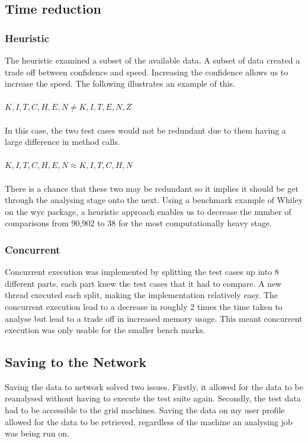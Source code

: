 \subsection{Time reduction}

\subsubsection{Heuristic}
The heuristic examined a subset of the available data. A subset of data created a trade off between confidence and speed. Increasing the confidence allows us to increase the speed. The following illustrates an example of this.
\paragraph{}
$K,I,T,C,H,E,N \neq K,I,T,E,N,Z $
\paragraph{}
In this case, the two test cases would not be redundant due to them having a large difference in method calls.
\paragraph{}
$K,I,T,C,H,E,N \approx K,I,T,C,H,N$
\paragraph{}
There is a chance that these two may be redundant so it implies it should be get through the analysing stage onto the next. Using a benchmark example of Whiley on the wyc package, a heuristic approach enables us to decrease the number of comparisons from 90,902 to 38 for the most computationally heavy stage.

\subsubsection{Concurrent}

Concurrent execution was implemented by splitting the test cases up into 8 different parts, each part knew the test cases that it had to compare. A new thread executed each split, making the implementation relatively easy. The concurrent execution lead to a decrease in roughly 2 times the time taken to analyse  but lead to a trade off in increased memory usage. This meant concurrent execution was only usable for the smaller bench marks.

\subsection{Saving to the Network}
Saving the data to network solved two issues. Firstly, it allowed for the data to be reanalysed without having to execute the test suite again. Secondly, the test data had to be accessible to the grid machines. Saving the data on my user profile allowed for the data to be retrieved, regardless of the machine an analysing job was being run on.


